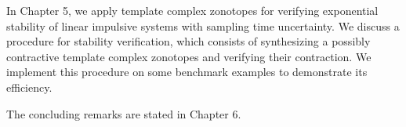 \documentclass[11pt,a4paper,twoside,openright]{article}
\begin{document}
In Chapter 5, we apply template complex zonotopes for verifying
exponential stability of linear impulsive systems with sampling time
uncertainty.  We discuss a procedure for stability verification, which
consists of synthesizing a possibly contractive template complex
zonotopes and verifying their contraction.  We implement this
procedure on some benchmark examples to demonstrate its efficiency.

The concluding remarks are stated in Chapter 6.










\end{document}
